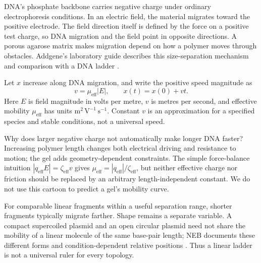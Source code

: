DNA's phosphate backbone carries negative charge under ordinary electrophoresis conditions. In an electric field, the material migrates toward the positive electrode. The field direction itself is defined by the force on a positive test charge, so DNA migration and the field point in opposite directions. A porous agarose matrix makes migration depend on how a polymer moves through obstacles. Addgene's laboratory guide describes this size-separation mechanism and comparison with a DNA ladder \cite{AddgeneGel}.


Let $x$ increase along DNA migration, and write the positive speed magnitude as
\begin{equation}
v=\mu_{\mathrm{eff}}|E|,\qquad x(t)=x(0)+v t.
\end{equation}
Here $E$ is field magnitude in volts per metre, $v$ is metres per second, and effective mobility $\mu_{\mathrm{eff}}$ has units $\mathrm{m^2\,V^{-1}\,s^{-1}}$. Constant $v$ is an approximation for a specified species and stable conditions, not a universal speed.

Why does larger negative charge not automatically make longer DNA faster? Increasing polymer length changes both electrical driving and resistance to motion; the gel adds geometry-dependent constraints. The simple force-balance intuition $|q_{\mathrm{eff}}E|=\zeta_{\mathrm{eff}}v$ gives $\mu_{\mathrm{eff}}=|q_{\mathrm{eff}}|/\zeta_{\mathrm{eff}}$, but neither effective charge nor friction should be replaced by an arbitrary length-independent constant. We do not use this cartoon to predict a gel's mobility curve.

For comparable linear fragments within a useful separation range, shorter fragments typically migrate farther. Shape remains a separate variable. A compact supercoiled plasmid and an open circular plasmid need not share the mobility of a linear molecule of the same base-pair length; NEB documents these different forms and condition-dependent relative positions \cite{NEBBands}. Thus a linear ladder is not a universal ruler for every topology.

